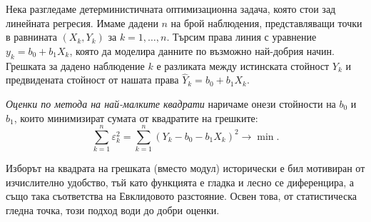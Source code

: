 Нека разгледаме детерминистичната оптимизационна задача, която стои зад линейната регресия. Имаме дадени $n$ на брой наблюдения, представляващи точки в равнината $(X_k, Y_k)$ за $k=1, \dots, n$. Търсим права линия с уравнение $y_k = b_0 + b_1 X_k$, която да моделира данните по възможно най-добрия начин. Грешката за дадено наблюдение $k$ е разликата между истинската стойност $Y_k$ и предвидената стойност от нашата права $\hat{Y}_k = b_0 + b_1 X_k$.

\begin{defn}\label{def:ols}
\emph{Оценки по метода на най-малките квадрати} наричаме онези стойности на $b_0$ и $b_1$, които минимизират сумата от квадратите на грешките:
\[
\sum_{k=1}^n \varepsilon_k^2 = \sum_{k=1}^n (Y_k - b_0 - b_1 X_k)^2 \to \min .
\]
\end{defn}

\begin{lecfigure}[Методът на най-малките квадрати. Точките са наблюденията
$(X_k, Y_k)$, правата е $b_0 + b_1 x$, а вертикалните отсечки са грешките
$\varepsilon_k = Y_k - b_0 - b_1 X_k$. Минимизира се сумата от техните \emph{квадрати}.
Отсечките са вертикални, а не перпендикулярни на правата: моделът обяснява $Y$ чрез $X$,
затова се мерят отклоненията само по $Y$.\label{fig:least-squares}]
\end{lecfigure}

Изборът на квадрата на грешката (вместо модул) исторически е бил мотивиран от изчислително удобство, тъй като функцията е гладка и лесно се диференцира, а също така съответства на Евклидовото разстояние. Освен това, от статистическа гледна точка, този подход води до добри оценки.

